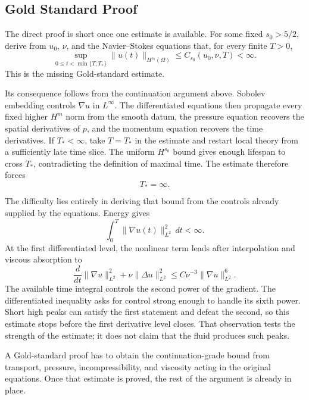 \subsection{Gold Standard Proof}\label{sub:GoldStandardProof}

The direct proof is short once one estimate is available.
For some fixed \(s_0>5/2\), derive from \(u_0\), \(\nu\), and the Navier--Stokes equations that, for every finite \(T>0\),
\[
  \sup_{0\leq t<\min\{T,T_*\}}
  \lVert u(t)\rVert_{H^{s_0}(\Omega)}
  \leq
  C_{s_0}(u_0,\nu,T)
  <
  \infty.
\]
This is the missing Gold-standard estimate.

Its consequence follows from the continuation argument above.
Sobolev embedding controls \(\nabla u\) in \(L^\infty\).
The differentiated equations then propagate every fixed higher \(H^m\) norm from the smooth datum, the pressure equation recovers the spatial derivatives of \(p\), and the momentum equation recovers the time derivatives.
If \(T_*<\infty\), take \(T=T_*\) in the estimate and restart local theory from a sufficiently late time slice.
The uniform \(H^{s_0}\) bound gives enough lifespan to cross \(T_*\), contradicting the definition of maximal time.
The estimate therefore forces
\[
  T_*=\infty.
\]

The difficulty lies entirely in deriving that bound from the controls already supplied by the equations.
Energy gives
\[
  \int_0^T
  \lVert\nabla u(t)\rVert_{L^2}^{2}\,dt
  <
  \infty.
\]
At the first differentiated level, the nonlinear term leads after interpolation and viscous absorption to
\[
  \frac{d}{dt}
  \lVert\nabla u\rVert_{L^2}^{2}
  +
  \nu\lVert\Delta u\rVert_{L^2}^{2}
  \leq
  C\nu^{-3}
  \lVert\nabla u\rVert_{L^2}^{6}.
\]
The available time integral controls the second power of the gradient.
The differentiated inequality asks for control strong enough to handle its sixth power.
Short high peaks can satisfy the first statement and defeat the second, so this estimate stops before the first derivative level closes.
That observation tests the strength of the estimate; it does not claim that the fluid produces such peaks.

A Gold-standard proof has to obtain the continuation-grade bound from transport, pressure, incompressibility, and viscosity acting in the original equations.
Once that estimate is proved, the rest of the argument is already in place.
